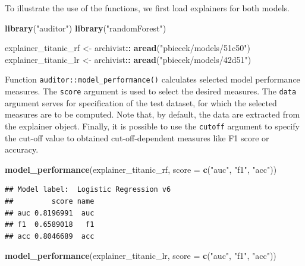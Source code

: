 \documentclass[12pt,]{krantz}
\newenvironment{Shaded}{\begin{snugshade}}{\end{snugshade}}
\newcommand{\DataTypeTok}[1]{\textcolor[rgb]{0.13,0.29,0.53}{#1}}
\newcommand{\KeywordTok}[1]{\textcolor[rgb]{0.13,0.29,0.53}{\textbf{#1}}}
\newcommand{\NormalTok}[1]{#1}
\newcommand{\OperatorTok}[1]{\textcolor[rgb]{0.81,0.36,0.00}{\textbf{#1}}}
\newcommand{\StringTok}[1]{\textcolor[rgb]{0.31,0.60,0.02}{#1}}
\begin{document}
To illustrate the use of the functions, we first load explainers for both models.

\begin{Shaded}
\begin{Highlighting}[]
\KeywordTok{library}\NormalTok{(}\StringTok{"auditor"}\NormalTok{)}
\KeywordTok{library}\NormalTok{(}\StringTok{"randomForest"}\NormalTok{)}

\NormalTok{explainer_titanic_rf <-}\StringTok{ }\NormalTok{archivist}\OperatorTok{::}\StringTok{ }\KeywordTok{aread}\NormalTok{(}\StringTok{"pbiecek/models/51c50"}\NormalTok{)}
\NormalTok{explainer_titanic_lr <-}\StringTok{ }\NormalTok{archivist}\OperatorTok{::}\StringTok{ }\KeywordTok{aread}\NormalTok{(}\StringTok{"pbiecek/models/42d51"}\NormalTok{)}
\end{Highlighting}
\end{Shaded}

Function \texttt{auditor::model\_performance()} calculates selected model performance measures. The \texttt{score} argument is used to select the desired measures. The \texttt{data} argument serves for specification of the test dataset, for which the selected measures are to be computed. Note that, by default, the data are extracted from the explainer object. Finally, it is possible to use the \texttt{cutoff} argument to specify the cut-off value to obtained cut-off-dependent measures like F1 score or accuracy.

\begin{Shaded}
\begin{Highlighting}[]
\KeywordTok{model_performance}\NormalTok{(explainer_titanic_rf, }\DataTypeTok{score =} \KeywordTok{c}\NormalTok{(}\StringTok{"auc"}\NormalTok{, }\StringTok{"f1"}\NormalTok{, }\StringTok{"acc"}\NormalTok{))}
\end{Highlighting}
\end{Shaded}

\begin{verbatim}
## Model label:  Logistic Regression v6 
##         score name
## auc 0.8196991  auc
## f1  0.6589018   f1
## acc 0.8046689  acc
\end{verbatim}

\begin{Shaded}
\begin{Highlighting}[]
\KeywordTok{model_performance}\NormalTok{(explainer_titanic_lr, }\DataTypeTok{score =} \KeywordTok{c}\NormalTok{(}\StringTok{"auc"}\NormalTok{, }\StringTok{"f1"}\NormalTok{, }\StringTok{"acc"}\NormalTok{))}
\end{Highlighting}
\end{Shaded}
\end{document}
